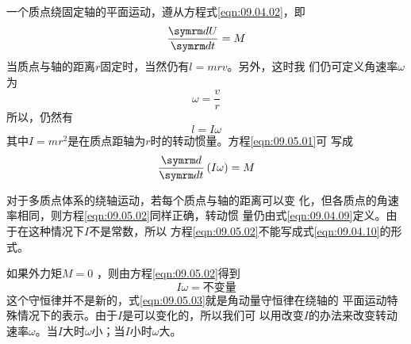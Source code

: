 \section[转动动能]{}\label{sec:09.05}

一个质点绕固定轴的平面运动，遵从方程式\eqref{eqn:09.04.02}，即
\begin{equation}\label{eqn:09.05.01}
  \frac { \dif U } { \dif t } = M
\end{equation}
当质点与轴的距离$ r $固定时，当然仍有$ l = m r v $。另外，这时我
们仍可定义角速率$ \omega $为
\begin{equation*}
  \omega = \frac { v } { r }
\end{equation*}
所以，仍然有
\begin{equation*}
  l = I \omega
\end{equation*}
其中$ I = m r ^ { 2 } $是在质点距轴为$ r $时的转动惯量。方程\eqref{eqn:09.05.01}可
写成
\begin{equation}\label{eqn:09.05.02}
  \frac { \dif } { \dif t } \left( I \omega \right) = M
\end{equation}

对于多质点体系的绕轴运动，若每个质点与轴的距离可以变
化，但各质点的角速率相同，则方程\eqref{eqn:09.05.02}同样正确，转动惯
量仍由式\eqref{eqn:09.04.09}定义。由于在这种情况下$ I $不是常数，所以
方程\eqref{eqn:09.05.02}不能写成式\eqref{eqn:09.04.10}的形式。

如果外力矩$ M = 0 $ ，则由方程\eqref{eqn:09.05.02}得到
\begin{equation}\label{eqn:09.05.03}
  I \omega = \text{不变量}
\end{equation}
这个守恒律并不是新的，式\eqref{eqn:09.05.03}就是角动量守恒律在绕轴的
平面运动特殊情况下的表示。由于$ I $是可以变化的，所以我们可
以用改变$ I $的办法来改变转动速率$ \omega $。当$ I $大时$ \omega $小；当$ I $小时$ \omega $大。

